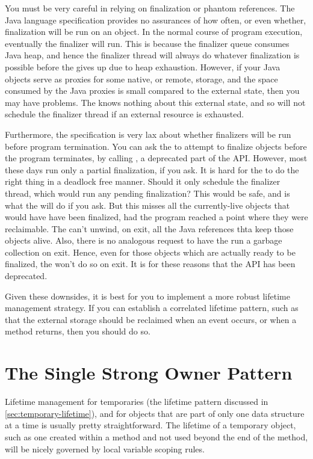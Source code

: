 You must be very careful in relying on finalization or phantom references. The
Java language specification provides no assurances of how often, or even whether,
finalization will be run on an object. In the normal course of program execution,
eventually the finalizer will run. This is because the finalizer queue consumes
Java heap, and hence the finalizer thread will always do whatever finalization is
possible before the \jre gives up due to heap exhaustion. However, if your Java
objects serve as proxies for some native, or remote, storage, and the space
consumed by the Java proxies is small compared to the external state, then you
may have problems. The \jre knows nothing about this external state, and so will
not schedule the finalizer thread if an external resource is exhausted.

Furthermore, the specification is very lax about whether finalizers will be run
before program termination. You can ask the \jre to attempt to finalize objects
before the program terminates, by calling
, a deprecated part of the API. However,
most \jres these days run only a partial finalization, if you ask. It is hard for
the \jre to do the right thing in a deadlock free manner. Should it only schedule
the finalizer thread, which would run any pending finalization? This would be
safe, and is what the \jre will do if you ask. But this misses all the
currently-live objects that would have have been finalized, had the program
reached a point where they were reclaimable. The \jre can't unwind, on exit, all
the Java references thta keep those objects alive. Also, there is no analogous
request to have the \jre run a garbage collection on exit. Hence, even for those
objects which are actually ready to be finalized, the \jre won't do so on exit.
It is for these reasons that the API has been deprecated.

Given these downsides, it is best for you to implement a more robust lifetime
management strategy. If you can establish a correlated lifetime pattern, such as
that the external storage should be reclaimed when an event occurs, or when a
method returns, then you should do so.

\section{The Single Strong Owner Pattern}

Lifetime management for temporaries (the lifetime pattern discussed in
\autoref{sec:temporary-lifetime}), and for objects that are part of only one data
structure at a time is usually pretty straightforward. The lifetime of a
temporary object, such as one created within a method and not used beyond the end
of the method, will be nicely governed by local variable scoping rules.

